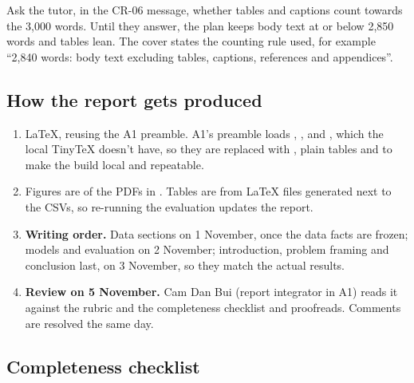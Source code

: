\begin{team}
Ask the tutor, in the CR-06 message, whether tables and captions count towards the 3,000 words.
Until they answer, the plan keeps body text at or below 2,850 words and tables lean. The cover
states the counting rule used, for example ``2,840 words: body text excluding tables, captions,
references and appendices''.
\end{team}

\subsection{How the report gets produced}

\begin{enumerate}
  \item LaTeX, reusing the A1 preamble. A1's preamble loads , ,
     and , which the local TinyTeX doesn't have, so they are
    replaced with , plain tables and  to make the build
    local and repeatable.
  \item Figures are  of the PDFs in
    . Tables are  from LaTeX files generated next
    to the CSVs, so re-running the evaluation updates the report.
  \item \textbf{Writing order.} Data sections on 1 November, once the data facts are frozen;
    models and evaluation on 2 November; introduction, problem framing and conclusion last, on
    3 November, so they match the actual results.
  \item \textbf{Review on 5 November.} Cam Dan Bui (report integrator in A1) reads it against
    the rubric and the completeness checklist and proofreads. Comments are resolved the same day.
\end{enumerate}

\subsection{Completeness checklist}

